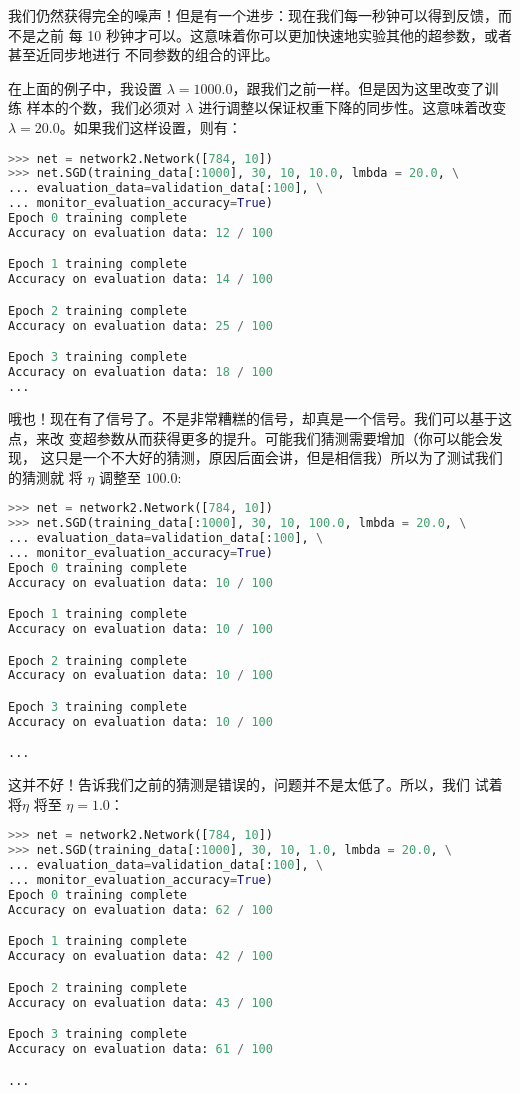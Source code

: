 我们仍然获得完全的噪声！但是有一个进步：现在我们每一秒钟可以得到反馈，而不是之前
每 10 秒钟才可以。这意味着你可以更加快速地实验其他的超参数，或者甚至近同步地进行
不同参数的组合的评比。

在上面的例子中，我设置 $\lambda=1000.0$，跟我们之前一样。但是因为这里改变了训练
样本的个数，我们必须对 $\lambda$ 进行调整以保证权重下降的同步性。这意味着改变
$\lambda = 20.0$。如果我们这样设置，则有：

\begin{lstlisting}[language=Python]
>>> net = network2.Network([784, 10])
>>> net.SGD(training_data[:1000], 30, 10, 10.0, lmbda = 20.0, \
... evaluation_data=validation_data[:100], \
... monitor_evaluation_accuracy=True)
Epoch 0 training complete
Accuracy on evaluation data: 12 / 100

Epoch 1 training complete
Accuracy on evaluation data: 14 / 100

Epoch 2 training complete
Accuracy on evaluation data: 25 / 100

Epoch 3 training complete
Accuracy on evaluation data: 18 / 100
...
\end{lstlisting}

哦也！现在有了信号了。不是非常糟糕的信号，却真是一个信号。我们可以基于这点，来改
变超参数从而获得更多的提升。可能我们猜测\learningrate{}需要增加（你可以能会发现，
这只是一个不大好的猜测，原因后面会讲，但是相信我）所以为了测试我们的猜测就
将 $\eta$ 调整至 $100.0$:
\begin{lstlisting}[language=Python]
>>> net = network2.Network([784, 10])
>>> net.SGD(training_data[:1000], 30, 10, 100.0, lmbda = 20.0, \
... evaluation_data=validation_data[:100], \
... monitor_evaluation_accuracy=True)
Epoch 0 training complete
Accuracy on evaluation data: 10 / 100

Epoch 1 training complete
Accuracy on evaluation data: 10 / 100

Epoch 2 training complete
Accuracy on evaluation data: 10 / 100

Epoch 3 training complete
Accuracy on evaluation data: 10 / 100

...
\end{lstlisting}

这并不好！告诉我们之前的猜测是错误的，问题并不是\learningrate{}太低了。所以，我们
试着将$\eta$ 将至 $\eta=1.0$：
\begin{lstlisting}[language=Python]
>>> net = network2.Network([784, 10])
>>> net.SGD(training_data[:1000], 30, 10, 1.0, lmbda = 20.0, \
... evaluation_data=validation_data[:100], \
... monitor_evaluation_accuracy=True)
Epoch 0 training complete
Accuracy on evaluation data: 62 / 100

Epoch 1 training complete
Accuracy on evaluation data: 42 / 100

Epoch 2 training complete
Accuracy on evaluation data: 43 / 100

Epoch 3 training complete
Accuracy on evaluation data: 61 / 100

...
\end{lstlisting}

